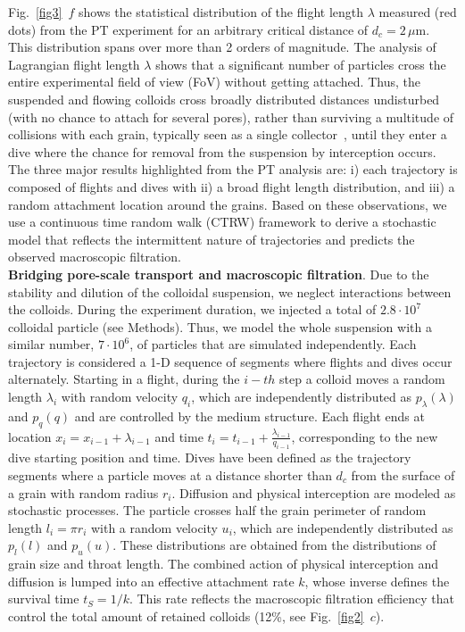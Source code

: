 \documentclass[singlecolumn,pre,notitlepage,preprintnumbers,floatfix,superscriptaddress]{revtex4-1}
\begin{document}
\noindent
Fig.~\ref{fig3}~$f$ shows the statistical distribution of the flight length $\lambda$ measured (red dots) from the PT experiment for an arbitrary critical distance of $d_c = 2 \, \mu$m. This distribution spans over more than 2 orders of magnitude. The analysis of Lagrangian flight length $\lambda$ shows that a significant number of particles cross the entire experimental field of view (FoV) without getting attached. Thus, the suspended and flowing colloids cross broadly distributed distances undisturbed (with no chance to attach for several pores), rather than surviving a multitude of collisions with each grain, typically seen as a single collector~\cite{YaoEST1971,Johnson2018}, until they enter a dive where the chance for removal from the suspension by interception occurs.\\

\noindent
The three major results highlighted from the PT analysis are: i) each trajectory is composed of flights and dives with ii) a broad flight length distribution, and iii) a random attachment location around the grains. Based on these observations, we use a continuous time random walk (CTRW) framework to derive a stochastic model that reflects the intermittent nature of trajectories and predicts the observed macroscopic filtration. \\

\noindent
\textbf{Bridging pore-scale transport and macroscopic filtration}. Due to the stability and dilution of the colloidal suspension, we neglect interactions between the colloids. During the experiment duration, we injected a total of $2.8 \cdot 10^7$ colloidal particle (see Methods). Thus, we model the whole suspension with a similar number, $7 \cdot 10^6$, of particles that are simulated independently. Each trajectory is considered a 1-D sequence of segments where flights and dives occur alternately. Starting in a flight, during the $i-th$ step a colloid moves a random length $\lambda_i$ with random velocity $q_i$, which are independently distributed as $p_\lambda(\lambda)$ and $p_q(q)$ and are controlled by the medium structure. Each flight ends at location $x_i = x_{i-1} + \lambda_{i-1}$ and time $t_i = t_{i-1} + \frac{\lambda_{i-1}}{q_{i-1}}$, corresponding to the new dive starting position and time. Dives have been defined as the trajectory segments where a particle moves at a distance shorter than $d_c$ from the surface of a grain with random radius $r_i$. Diffusion and physical interception are modeled as stochastic processes. The particle crosses half the grain perimeter of random length $l_i = \pi r_i$ with a random velocity $u_i$, which are independently distributed as $p_l(l)$ and $p_u(u)$. These distributions are obtained from the distributions of grain size and throat length. The combined action of physical interception and diffusion is lumped into an effective attachment rate $k$, whose inverse defines the survival time $t_S = 1/k$. This rate reflects the macroscopic filtration efficiency that control the total amount of retained colloids (12\%, see Fig.~\ref{fig2}~$c$). \\
\end{document}
